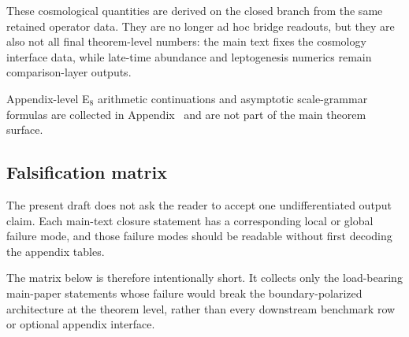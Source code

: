 \begin{remark}
These cosmological quantities are derived on the closed branch from the same retained operator
data. They are no longer ad hoc bridge readouts, but they are also not all final theorem-level
numbers: the main text fixes the cosmology interface data, while late-time abundance and
leptogenesis numerics remain comparison-layer outputs.
\end{remark}

Appendix-level E$_8$ arithmetic continuations and asymptotic scale-grammar formulas are collected
in Appendix~ and are not part of the main theorem surface.

\subsection{Falsification matrix}

The present draft does not ask the reader to accept one undifferentiated output claim. Each
main-text closure statement has a corresponding local or global failure mode, and those failure
modes should be readable without first decoding the appendix tables.

The matrix below is therefore intentionally short. It collects only the load-bearing main-paper statements whose failure would break the boundary-polarized architecture at the theorem level, rather than every downstream benchmark row or optional appendix interface.

